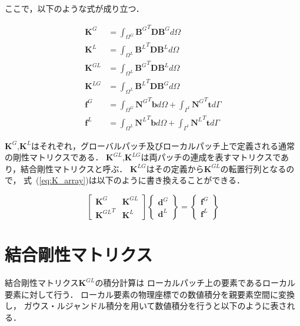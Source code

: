 \noindent
ここで，以下のような式が成り立つ．

\begin{eqnarray}
  \boldsymbol{K}^G&=\int_{\Omega^G} {\boldsymbol{B}^G}^T\boldsymbol{D}\boldsymbol{B}^Gd\Omega\\
  \boldsymbol{K}^L&=\int_{\Omega^L} {\boldsymbol{B}^L}^T\boldsymbol{D}\boldsymbol{B}^Ld\Omega\\
  \boldsymbol{K}^{GL}&=\int_{\Omega^L} {\boldsymbol{B}^G}^T\boldsymbol{D}\boldsymbol{B}^Ld\Omega\\
  \boldsymbol{K}^{LG}&=\int_{\Omega^L} {\boldsymbol{B}^L}^T\boldsymbol{D}\boldsymbol{B}^Gd\Omega\\
  \boldsymbol{f}^{G}&=\int_{\Omega^G} {\boldsymbol{N}^G}^T\boldsymbol{b}d\Omega+\int_{\Gamma^t} {\boldsymbol{N}^G}^T\boldsymbol{t}d\Gamma\\
  \boldsymbol{f}^{L}&=\int_{\Omega^L} {\boldsymbol{N}^L}^T\boldsymbol{b}d\Omega+\int_{\Gamma^t} {\boldsymbol{N}^L}^T\boldsymbol{t}d\Gamma
\end{eqnarray}

\noindent
$\boldsymbol{K}^G$,$\boldsymbol{K}^L$はそれぞれ，グローバルパッチ及びローカルパッチ上で定義される通常の剛性マトリクスである．
$\boldsymbol{K}^{GL}$,$\boldsymbol{K}^{LG}$は両パッチの連成を表すマトリクスであり，結合剛性マトリクスと呼ぶ．
$\boldsymbol{K}^{LG}$はその定義から$\boldsymbol{K}^{GL}$の転置行列となるので，
式~(\ref{eq:K_array})は以下のように書き換えることができる．

\begin{equation}
    \begin{bmatrix}
      \boldsymbol{K}^G & \boldsymbol{K}^{GL} \\
      {\boldsymbol{K}^{GL}}^T & \boldsymbol{K}^L
    \end{bmatrix}
    \left\{
    \begin{array}{c}
      \boldsymbol{d}^G \\
      \boldsymbol{d}^L
    \end{array}
    \right\} =
    \left\{
    \begin{array}{c}
      \boldsymbol{f}^G \\
      \boldsymbol{f}^L
    \end{array}
    \right\}
\end{equation}

\section{結合剛性マトリクス}
結合剛性マトリクス$\boldsymbol{K}^{GL}$の積分計算は
ローカルパッチ上の要素であるローカル要素に対して行う．
ローカル要素の物理座標での数値積分を親要素空間に変換し，
ガウス・ルジャンドル積分を用いて数値積分を行うと以下のように表される．

